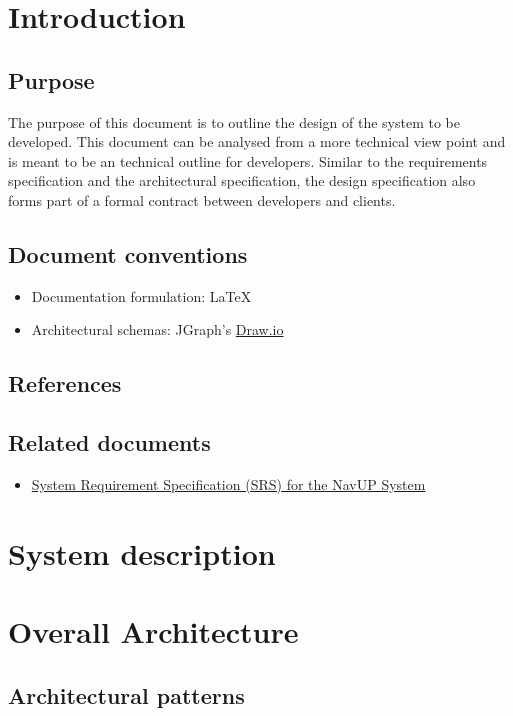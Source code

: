 \documentclass{article}
\begin{document}
\tableofcontents{}	

	\newpage
	\section{Introduction}
		\subsection{Purpose}
		The purpose of this document is to outline the design of the system to be developed. This document can be analysed from a more technical view point and is meant to be an technical outline for developers.  Similar to the requirements specification and the architectural specification, the design specification also forms part of a formal contract between developers and clients.
		\subsection{Document conventions}
			\begin{itemize}
				\item Documentation formulation:  LaTeX
				\item Architectural schemas: JGraph's \href{https://www.draw.io/}{Draw.io}
			\end{itemize}
		\subsection{References}
		\subsection{Related documents}
			\begin{itemize}
				\item \href{http://www.cs.up.ac.za/files/COS301/Download/1528/}{System Requirement Specification (SRS) for the NavUP System}
			\end{itemize}
	\section{System description}
	
	\section{Overall Architecture}
		\subsection{Architectural patterns}
\end{document}
